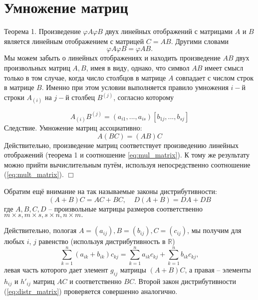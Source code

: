 \documentclass[a4paper, 12pt]{extarticle} %
\begin{document}
\clearpage

\section*{Умножение матриц}
Теорема 1. Произведение $\varphi A \varphi B$ двух линейных отображений с матрицами $A$ и $B$ является линейным отображением с матрицей $C = AB$. Другими словами
\begin{equation}
    \varphi A \varphi B = \varphi AB.
    \label{eq:mul_matrix}
\end{equation}
Мы можем забыть о линейных отображениях и находить произведение $AB$ двух произвольных матриц $A, B$, имея в виду, однако, что символ $AB$ имеет смысл только в том случае, когда число  столбцов в матрице $A$ совпадает с числом строк в матрице $B$. Именно при этом условии выполняется правило умножения $i-$й строки $A_{(i)}$ на $j-$й столбец $B^{(j)}$, согласно которому

\begin{equation}
    A_{(i)}B^{(j)} = (a_{i 1}, ..., a_{i s})[b_{1 j}, ..., b_{s j}]
    \label{eq:mult_matrix}
\end{equation}
Следствие. Умножение матриц ассоциативно:
\begin{equation}
    A(BC) = (AB)C
\end{equation}
Действительно, произведение матриц соответствует произведению линейных отображений (теорема 1 и соотношение \ref{eq:mul_matrix}). К тому же результату можно прийти вычислительным путём, используя непосредственно соотношение (\ref{eq:mult_matrix}). $\Box$

Обратим ещё внимание на так называемые законы дистрибутивности:
\begin{equation}
    (A + B)C = AC + BC, ~~~~~ D(A + B) = DA + DB
    \label{eq:distr_matrix}
\end{equation}
где $A, B, C, D$ -- произвольные матрицы размеров соответственно $m \times s, m \times s, s \times n, n \times m.$

Действительно, пологая $A = (a_{ij}), B = (b_{ij}), C = (c_{ij})$, мы получим для любых $i$, $j$ равенство (используя дистрибутивность в $\mathbb{R}$)
\begin{equation}
    \sum^n_{k = 1} (a_{ik} + b_{ik})c_{kj} = \sum^n_{k=1} a_{ik} c_{kj} + \sum^n_{k = 1} b_{ik} c_{kj},
\end{equation}
левая часть которого дает элемент $g_{ij}$ матрицы $(A + B)C$, а правая -- элементы $h_{ij}$ и $h'_{ij}$ матриц $AC$ и соответственно $BC$. Второй закон дистрибутивности (\ref{eq:distr_matrix}) проверяется совершенно аналогично.
\end{document}
